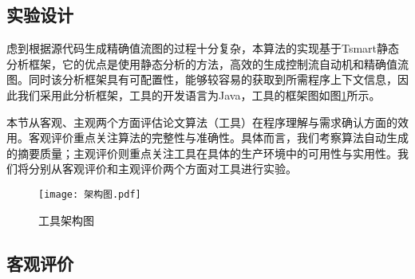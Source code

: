 \subsection{实验设计}

虑到根据源代码生成精确值流图的过程十分复杂，本算法的实现基于Tsmart静态分析框架，它的优点是使用静态分析的方法，高效的生成控制流自动机和精确值流图。同时该分析框架具有可配置性，能够较容易的获取到所需程序上下文信息，因此我们采用此分析框架，工具的开发语言为Java，工具的框架图如图\ref{fig:架构图}所示。

本节从客观、主观两个方面评估论文算法（工具）在程序理解与需求确认方面的效用。客观评价重点关注算法的完整性与准确性。具体而言，我们考察算法自动生成的摘要质量；主观评价则重点关注工具在具体的生产环境中的可用性与实用性。我们将分别从客观评价和主观评价两个方面对工具进行实验。

\begin{figure}[H]
	\centering
	\texttt{[image: 架构图.pdf]}
	\caption{工具架构图}
	\label{fig:架构图}
\end{figure}

\subsection{客观评价}

